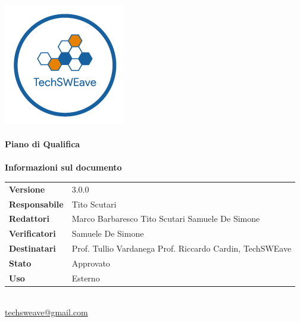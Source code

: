 \documentclass[a4paper]{article}
\begin{document}
\begin{titlepage}
    \begin{center}
        \includegraphics{../../../Images/logo}\\
        \vspace{20px}
        \textcolor{logo}{\hrulefill}\\
        \vspace{20px}
        \textbf{\huge\textcolor{logo}{Piano di Qualifica}}\\
        \vspace{10px}
        \textcolor{logo}{\hrulefill}\\
        \vspace{40px}
        \textbf{\Large Informazioni sul documento}\\
        \vspace{20px}
        \begin{tabular}{p{100px} | p{100px}}
            \textbf{Versione}     & 3.0.0                                                                      \\
            \textbf{Responsabile} & Tito Scutari                                                               \\
            \textbf{Redattori}    & Marco Barbaresco \newline Tito Scutari \newline Samuele De Simone          \\
            \textbf{Verificatori} & Samuele De Simone                                                          \\
            \textbf{Destinatari}  & Prof. Tullio Vardanega \newline Prof. Riccardo Cardin, \newline TechSWEave \\
            \textbf{Stato}        & Approvato                                                                  \\
            \textbf{Uso}          & Esterno                                                                    \\
        \end{tabular}\\
        \vspace{60px}
        \href{mailto:techsweave@gmail.com}{techsweave@gmail.com}\\

    \end{center}
\end{titlepage}
\end{document}
